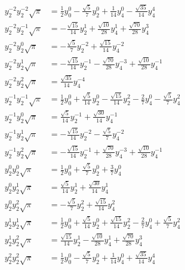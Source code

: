 \documentclass[11pt]{article}
\begin{document}
\begin{align}
y_2^{-2}y_2^{-2}\sqrt{\pi} &= \frac{1}{2 }y_0^{0} - \frac{\sqrt{5}}{7 }y_2^{0} + \frac{1}{14 }y_4^{0} - \frac{\sqrt{35}}{14 }y_4^{4} \\
y_2^{-2}y_2^{-1}\sqrt{\pi} &= - \frac{\sqrt{15}}{14 }y_2^{1} + \frac{\sqrt{10}}{28 }y_4^{1} + \frac{\sqrt{70}}{28 }y_4^{3} \\
y_2^{-2}y_2^{0}\sqrt{\pi} &= - \frac{\sqrt{5}}{7 }y_2^{-2} + \frac{\sqrt{15}}{14 }y_4^{-2} \\
y_2^{-2}y_2^{1}\sqrt{\pi} &= - \frac{\sqrt{15}}{14 }y_2^{-1} - \frac{\sqrt{70}}{28 }y_4^{-3} + \frac{\sqrt{10}}{28 }y_4^{-1} \\
y_2^{-2}y_2^{2}\sqrt{\pi} &= \frac{\sqrt{35}}{14 }y_4^{-4} \\
y_2^{-1}y_2^{-1}\sqrt{\pi} &= \frac{1}{2 }y_0^{0} + \frac{\sqrt{5}}{14 }y_2^{0} - \frac{\sqrt{15}}{14 }y_2^{2} - \frac{2}{7 }y_4^{0} - \frac{\sqrt{5}}{7 }y_4^{2} \\
y_2^{-1}y_2^{0}\sqrt{\pi} &= \frac{\sqrt{5}}{14 }y_2^{-1} + \frac{\sqrt{30}}{14 }y_4^{-1} \\
y_2^{-1}y_2^{1}\sqrt{\pi} &= - \frac{\sqrt{15}}{14 }y_2^{-2} - \frac{\sqrt{5}}{7 }y_4^{-2} \\
y_2^{-1}y_2^{2}\sqrt{\pi} &= - \frac{\sqrt{15}}{14 }y_2^{-1} + \frac{\sqrt{70}}{28 }y_4^{-3} + \frac{\sqrt{10}}{28 }y_4^{-1} \\
y_2^{0}y_2^{0}\sqrt{\pi} &= \frac{1}{2 }y_0^{0} + \frac{\sqrt{5}}{7 }y_2^{0} + \frac{3}{7 }y_4^{0} \\
y_2^{0}y_2^{1}\sqrt{\pi} &= \frac{\sqrt{5}}{14 }y_2^{1} + \frac{\sqrt{30}}{14 }y_4^{1} \\
y_2^{0}y_2^{2}\sqrt{\pi} &= - \frac{\sqrt{5}}{7 }y_2^{2} + \frac{\sqrt{15}}{14 }y_4^{2} \\
y_2^{1}y_2^{1}\sqrt{\pi} &= \frac{1}{2 }y_0^{0} + \frac{\sqrt{5}}{14 }y_2^{0} + \frac{\sqrt{15}}{14 }y_2^{2} - \frac{2}{7 }y_4^{0} + \frac{\sqrt{5}}{7 }y_4^{2} \\
y_2^{1}y_2^{2}\sqrt{\pi} &= \frac{\sqrt{15}}{14 }y_2^{1} - \frac{\sqrt{10}}{28 }y_4^{1} + \frac{\sqrt{70}}{28 }y_4^{3} \\
y_2^{2}y_2^{2}\sqrt{\pi} &= \frac{1}{2 }y_0^{0} - \frac{\sqrt{5}}{7 }y_2^{0} + \frac{1}{14 }y_4^{0} + \frac{\sqrt{35}}{14 }y_4^{4}
\end{align}
\end{document}
